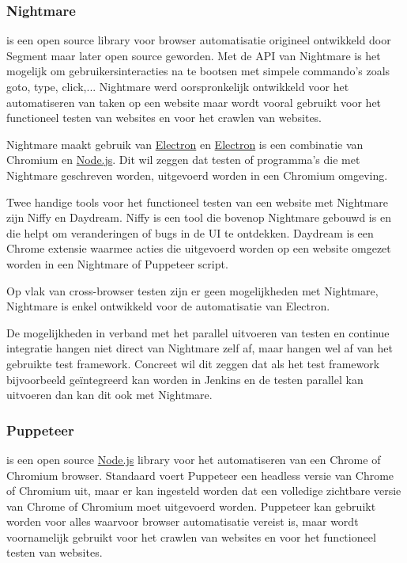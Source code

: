 \subsubsection{Nightmare}

\textcite{Nightmare} is een open source \gls{library} voor browser automatisatie origineel ontwikkeld door Segment maar later open source geworden. Met de \gls{API} van Nightmare is het mogelijk om gebruikersinteracties na te bootsen met simpele commando's zoals goto, type, click,... Nightmare werd oorspronkelijk ontwikkeld voor het automatiseren van taken op een website maar wordt vooral gebruikt voor het functioneel testen van websites en voor het crawlen van websites.

Nightmare maakt gebruik van \hyperref[electron]{Electron} en \hyperref[electron]{Electron} is een combinatie van Chromium en \hyperref[nodejs]{Node.js}. Dit wil zeggen dat testen of programma's die met Nightmare geschreven worden, uitgevoerd worden in een Chromium omgeving.

Twee handige \glspl{tool} voor het functioneel testen van een website met Nightmare zijn Niffy en Daydream. Niffy is een \gls{tool} die bovenop Nightmare gebouwd is en die helpt om veranderingen of bugs in de \gls{UI} te ontdekken. Daydream is een Chrome extensie waarmee acties die uitgevoerd worden op een website omgezet worden in een Nightmare of Puppeteer script.

Op vlak van cross-browser testen zijn er geen mogelijkheden met Nightmare, Nightmare is enkel ontwikkeld voor de automatisatie van Electron.

De mogelijkheden in verband met het parallel uitvoeren van testen en continue integratie hangen niet direct van Nightmare zelf af, maar hangen wel af van het gebruikte test \gls{framework}. Concreet wil dit zeggen dat als het test \gls{framework} bijvoorbeeld geïntegreerd kan worden in Jenkins en de testen parallel kan uitvoeren dan kan dit ook met Nightmare.

\clearpage
\subsubsection{Puppeteer}
\textcite{Puppeteer} is een open source \hyperref[nodejs]{Node.js} \gls{library} voor het automatiseren van een Chrome of Chromium browser. Standaard voert Puppeteer een \gls{headless} versie van Chrome of Chromium uit, maar er kan ingesteld worden dat een volledige zichtbare versie van Chrome of Chromium moet uitgevoerd worden. Puppeteer kan gebruikt worden voor alles waarvoor browser automatisatie vereist is, maar wordt voornamelijk gebruikt voor het crawlen van websites en voor het functioneel testen van websites.

